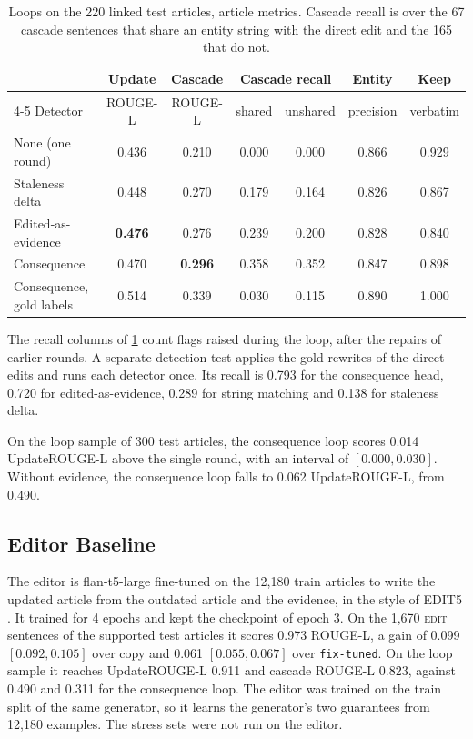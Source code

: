 \documentclass[]{paper}
\newcommand{\edit}{\textsc{edit}}
\newcommand{\run}[1]{\texttt{#1}}
\newcommand{\recallrule}{\cmidrule(lr){4-5}}
\begin{document}
\begin{table}[H]
\caption{Loops on the 220 linked test articles, article metrics. Cascade recall is over the 67 cascade sentences that share an entity string with the direct edit and the 165 that do not.}
\label{tab:loops}
\centering
\footnotesize
\setlength{\tabcolsep}{4pt}
\begin{tabular}{lcccccc}
\toprule
& Update & Cascade & \multicolumn{2}{c}{Cascade recall} & Entity & Keep \\
\recallrule
Detector & ROUGE-L & ROUGE-L & shared & unshared & precision & verbatim \\
\midrule
None (one round) & 0.436 & 0.210 & 0.000 & 0.000 & 0.866 & 0.929 \\
Staleness delta & 0.448 & 0.270 & 0.179 & 0.164 & 0.826 & 0.867 \\
Edited-as-evidence & \textbf{0.476} & 0.276 & 0.239 & 0.200 & 0.828 & 0.840 \\
Consequence & 0.470 & \textbf{0.296} & 0.358 & 0.352 & 0.847 & 0.898 \\
Consequence, gold labels & 0.514 & 0.339 & 0.030 & 0.115 & 0.890 & 1.000 \\
\bottomrule
\end{tabular}
\end{table}

The recall columns of \cref{tab:loops} count flags raised during the loop, after the repairs of earlier rounds. A separate detection test applies the gold rewrites of the direct edits and runs each detector once. Its recall is 0.793 for the consequence head, 0.720 for edited-as-evidence, 0.289 for string matching and 0.138 for staleness delta.

On the loop sample of 300 test articles, the consequence loop scores 0.014 UpdateROUGE-L above the single round, with an interval of $[0.000, 0.030]$. Without evidence, the consequence loop falls to 0.062 UpdateROUGE-L, from 0.490.

\subsection{Editor Baseline}

The editor is flan-t5-large fine-tuned on the 12,180 train articles to write the updated article from the outdated article and the evidence, in the style of EDIT5 \citep{iv-etal-2022-fruit}. It trained for 4 epochs and kept the checkpoint of epoch 3. On the 1,670 \edit{} sentences of the supported test articles it scores 0.973 ROUGE-L, a gain of 0.099 $[0.092, 0.105]$ over copy and 0.061 $[0.055, 0.067]$ over \run{fix-tuned}. On the loop sample it reaches UpdateROUGE-L 0.911 and cascade ROUGE-L 0.823, against 0.490 and 0.311 for the consequence loop. The editor was trained on the train split of the same generator, so it learns the generator's two guarantees from 12,180 examples. The stress sets were not run on the editor.
\end{document}
